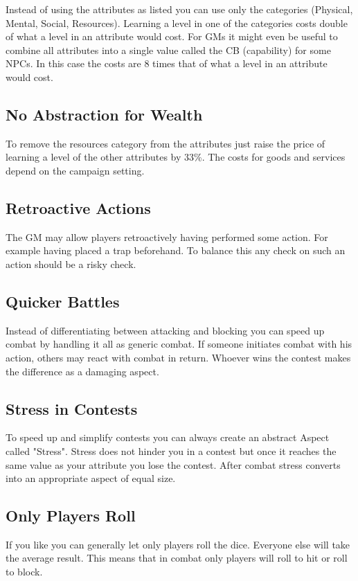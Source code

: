 \documentclass[11pt]{article}
\begin{document}
{Instead of using the attributes as listed you can use only the categories (Physical, Mental, Social, Resources). Learning a level in one of the categories costs double of what a level in an attribute would cost.
For GMs it might even be useful to combine all attributes into a single value called the CB (capability) for some NPCs. In this case the costs are 8 times that of what a level in an attribute would cost.

\subsection{No Abstraction for Wealth}
\label{sec:org0e5a0da}

To remove the resources category from the attributes just raise the price of learning a level of the other attributes by 33\%. The costs for goods and services
depend on the campaign setting.

\subsection{Retroactive Actions}
\label{sec:orgbaa67d3}

The GM may allow players retroactively having performed some action. For example having placed a trap beforehand. To balance this any check on such an action should be a risky check.

\subsection{Quicker Battles}
\label{sec:org5386442}

Instead of differentiating between attacking and blocking you can speed up combat by handling it all as generic combat. If someone initiates combat with his action, others may react with combat in return. Whoever wins the contest makes the difference as a damaging aspect.

\subsection{Stress in Contests}
\label{sec:orgf6a026f}

To speed up and simplify contests you can always create an abstract Aspect called "Stress". Stress does not hinder you in a contest but once it reaches the same value as your attribute you lose the contest. After combat stress converts into an appropriate aspect of equal size.

\subsection{Only Players Roll}
\label{sec:orgaa27eed}
If you like you can generally let only players roll the dice. Everyone else will take the average result. This means that in combat only players will roll to hit or roll to block.

}
\end{document}
